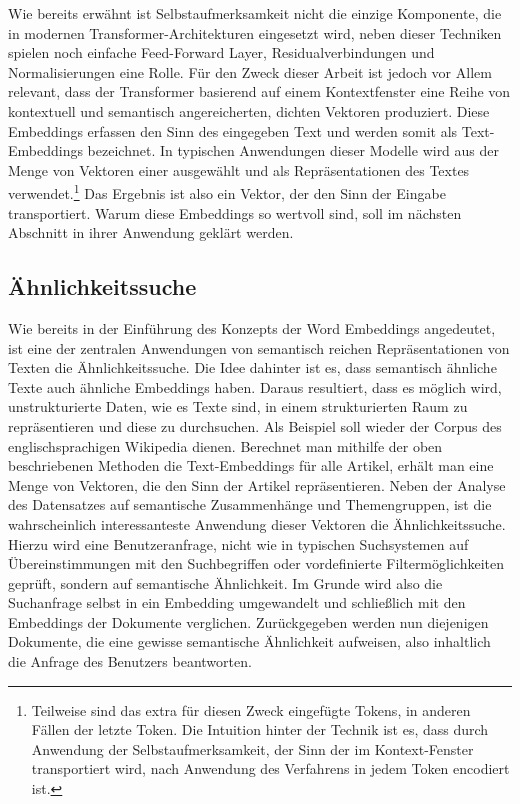 Wie bereits erwähnt ist Selbstaufmerksamkeit nicht die einzige Komponente, die in modernen Transformer-Architekturen eingesetzt wird, neben dieser Techniken spielen noch einfache Feed-Forward Layer, Residualverbindungen und Normalisierungen eine Rolle. Für den Zweck dieser Arbeit ist jedoch vor Allem relevant, dass der Transformer basierend auf einem Kontextfenster eine Reihe von kontextuell und semantisch angereicherten, dichten Vektoren produziert. Diese Embeddings erfassen den Sinn des eingegeben Text und werden somit als Text-Embeddings bezeichnet. In typischen Anwendungen dieser Modelle wird aus der Menge von Vektoren einer ausgewählt und als Repräsentationen des Textes verwendet.\footnote{Teilweise sind das extra für diesen Zweck eingefügte Tokens, in anderen Fällen der letzte Token. Die Intuition hinter der Technik ist es, dass durch Anwendung der Selbstaufmerksamkeit, der Sinn der im Kontext-Fenster transportiert wird, nach Anwendung des Verfahrens in jedem Token encodiert ist. } Das Ergebnis ist also ein Vektor, der den Sinn der Eingabe transportiert. Warum diese Embeddings so wertvoll sind, soll im nächsten Abschnitt in ihrer Anwendung geklärt werden.

\subsection{Ähnlichkeitssuche}
Wie bereits in der Einführung des Konzepts der Word Embeddings angedeutet, ist eine der zentralen Anwendungen von semantisch reichen Repräsentationen von Texten die Ähnlichkeitssuche. Die Idee dahinter ist es, dass semantisch ähnliche Texte auch ähnliche Embeddings haben. Daraus resultiert, dass es möglich wird, unstrukturierte Daten, wie es Texte sind, in einem strukturierten Raum zu repräsentieren und diese zu durchsuchen. Als Beispiel soll wieder der Corpus des englischsprachigen Wikipedia dienen. Berechnet man mithilfe der oben beschriebenen Methoden die Text-Embeddings für alle Artikel, erhält man eine Menge von Vektoren, die den Sinn der Artikel repräsentieren. Neben der Analyse des Datensatzes auf semantische Zusammenhänge und Themengruppen, ist die wahrscheinlich interessanteste Anwendung dieser Vektoren die Ähnlichkeitssuche. Hierzu wird eine Benutzeranfrage, nicht wie in typischen Suchsystemen auf Übereinstimmungen mit den Suchbegriffen oder vordefinierte Filtermöglichkeiten geprüft, sondern auf semantische Ähnlichkeit. Im Grunde wird also die Suchanfrage selbst in ein Embedding umgewandelt und schließlich mit den Embeddings der Dokumente verglichen. Zurückgegeben werden nun diejenigen Dokumente, die eine gewisse semantische Ähnlichkeit aufweisen, also inhaltlich die Anfrage des Benutzers beantworten. \\

